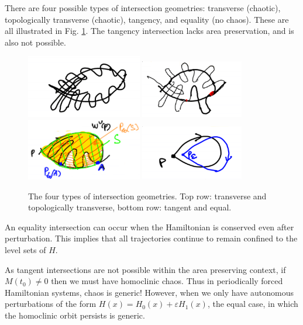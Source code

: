 There are four possible types of intersection geometries: transverse (chaotic), topologically transverse (chaotic), tangency, and equality (no chaos). These are all illustrated in Fig. \ref{fig:intersection_types}. The tangency intersection lacks area preservation, and is also not possible.

\begin{figure}[h!]
	\centering
	\includegraphics[width=0.45\textwidth]{figures/ch8/10intersection_geometry_A.png}
	\includegraphics[width=0.4\textwidth]{figures/ch8/10intersection_geometry_B.png}
	\includegraphics[width=0.45\textwidth]{figures/ch8/10intersection_geometry_C.png}
	\includegraphics[width=0.4\textwidth]{figures/ch8/10intersection_geometry_D.png}
	\caption{The four types of intersection geometries. Top row: transverse and topologically transverse, bottom row: tangent and equal.}
	\label{fig:intersection_types}
\end{figure}

An equality intersection can occur when the Hamiltonian is conserved even after perturbation. This implies that all trajectories continue to remain confined to the level sets of $H$. 

As tangent intersections are not possible within the area preserving context, if $M(t_0) \neq 0$ then we must have homoclinic chaos. Thus in periodically forced Hamiltonian systems, chaos is generic! However, when we only have autonomous perturbations of the form $H(x)=H_0(x)+\varepsilon H_1(x)$, the equal case, in which the homoclinic orbit persists is generic. 

